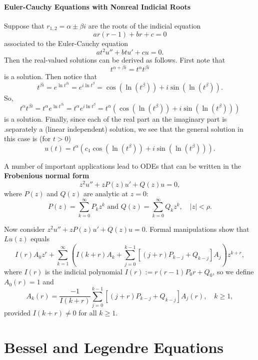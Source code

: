 
\paragraph{Euler-Cauchy Equations with Nonreal Indicial Roots}
Suppose that \(r_{1,2} = \alpha \pm \beta i\) are the roots of the indicial equation
\[ar(r - 1) + br + c = 0\]
associated to the Euler-Cauchy equation
\[at^2u'' + btu' + cu = 0.\]
Then the real-valued solutions can be derived as follows. First note that
\[t^{\alpha + \beta i} = t^\alpha t^{\beta i}\]
is a solution. Then notice that
\[t^{\beta i} = e^{\ln t^{\beta i}} = e^{i \ln t^\beta} = \cos(\ln(t^\beta)) + i\sin(\ln(t^\beta)).\]
So,
\[t^\alpha t^{\beta i} = t^{\alpha} e^{\ln t^{\beta i}} = t^\alpha e^{i \ln t^\beta} = t^\alpha \left(\cos(\ln(t^\beta)) + i\sin(\ln(t^\beta))\right)\]
is a solution. Finally, since each of the real part an the imaginary part is .separately a (linear independent) solution, we see that the general solution in this case is (for \(t > 0\))
\[u(t) = t^{\alpha}\left(c_1 \cos(\ln(t^\beta)) + i\sin(\ln(t^\beta))\right).\]


\bigskip
A number of important applications lead to ODEs that can be written in the \textbf{Frobenious normal form}
\[z^2u'' + zP(z)u' + Q(z)u = 0,\]
where \(P(z)\) and \(Q(z)\) are analytic at \(z = 0\):
\[P(z) = \sum_{k=0}^{\infty}P_k z^k \text{ and } Q(z) = \sum_{k=0}^{\infty}Q_k z^k, \quad |z| < \rho.\]

Now consider \(z^2u'' + zP(z) u' + Q(z)u = 0\). Formal manipulations show that \(Lu(z)\) equals
\[I(r)A_0 z^r + \sum_{k=1}^{\infty}\left(I(k + r) A_k + \sum_{j=0}^{k-1} \left[(j + r)P_{k - j} + Q_{k - j} \right]A_j \right)z^{k + r},\]
where \(I(r)\) is the indicial polynomial \(I(r) := r(r - 1)P_0 r + Q_0\), so we define \(A_0(r) = 1\) and
\[A_k(r) = \frac{-1}{I(k + r)} \sum_{j=0}^{k-1}[(j + r)P_{k-j} + Q_{k - j}]A_j(r), \quad k \geq 1,\]
provided \(I(k + r) \neq 0\) for all \(k \geq 1\).

\section{Bessel and Legendre Equations}
